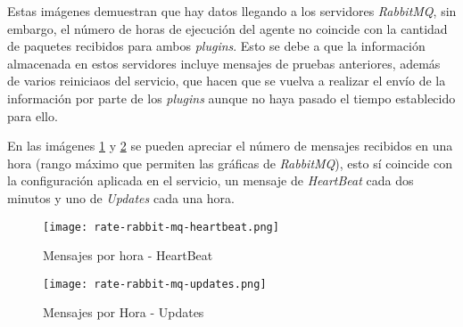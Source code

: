         Estas imágenes demuestran que hay datos llegando a los servidores \textit{RabbitMQ}, sin embargo, el número de horas de ejecución del agente no coincide con la cantidad de paquetes recibidos para ambos \textit{plugins}. Esto se debe a que la información almacenada en estos servidores incluye mensajes de pruebas anteriores, además de varios reiniciaos del servicio, que hacen que se vuelva a realizar el envío de la información por parte de los \textit{plugins} aunque no haya pasado el tiempo establecido para ello.
        
        En las imágenes \ref{fig:rabbitmq-rate-heartbeat} y \ref{fig:rabbitmq-rate-updates} se pueden apreciar el número de mensajes recibidos en una hora (rango máximo que permiten las gráficas de \textit{RabbitMQ}), esto sí coincide con la configuración aplicada en el servicio, un mensaje de \textit{HeartBeat} cada dos minutos y uno de \textit{Updates} cada una hora.
        
        \begin{figure}[h!]
        \centering
            \texttt{[image: rate-rabbit-mq-heartbeat.png]}
            \caption{Mensajes por hora - HeartBeat}
            \label{fig:rabbitmq-rate-heartbeat}
        \end{figure}
        
        \begin{figure}[h!]
        \centering
            \texttt{[image: rate-rabbit-mq-updates.png]}
            \caption{Mensajes por Hora - Updates}
            \label{fig:rabbitmq-rate-updates}
        \end{figure}
        